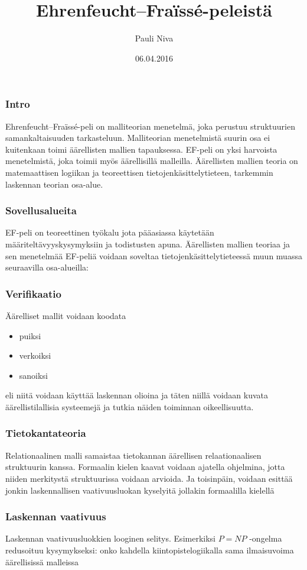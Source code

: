 \documentclass{beamer}
\title{Ehrenfeucht--Fraïssé-peleistä}
\author{Pauli Niva}
\date{06.04.2016}
\begin{document}
\frame{\titlepage}

\begin{frame}
\frametitle{Intro}
Ehrenfeucht--Fraïssé-peli on malliteorian menetelmä, joka perustuu struktuurien samankaltaisuuden tarkasteluun. \pause Malliteorian menetelmistä suurin osa ei kuitenkaan toimi äärellisten mallien tapauksessa. \pause EF-peli on yksi harvoista menetelmistä, joka toimii myös äärellisillä malleilla. \pause Äärellisten mallien teoria on matemaattisen logiikan ja teoreettisen tietojenkäsittelytieteen, tarkemmin laskennan teorian osa-alue.
\end{frame}

\begin{frame}
\frametitle{Sovellusalueita}
EF-peli on teoreettinen työkalu jota pääasiassa käytetään määriteltävyyskysymyksiin ja todistusten apuna.
Äärellisten mallien teoriaa ja sen menetelmää EF-peliä voidaan soveltaa tietojenkäsittelytieteessä muun muassa seuraavilla osa-alueilla:
\end{frame}

\begin{frame}
\frametitle{Verifikaatio}
Äärelliset mallit voidaan koodata
\begin{itemize}
\item<1-> puiksi
\item<2-> verkoiksi
\item<3-> sanoiksi
\end{itemize}
\pause \pause \pause
eli niitä voidaan käyttää laskennan olioina ja täten niillä voidaan kuvata äärellistilallisia systeemejä ja tutkia näiden toiminnan oikeellisuutta.
\end{frame}

\begin{frame}
\frametitle{Tietokantateoria}
Relationaalinen malli samaistaa tietokannan äärellisen relaationaalisen struktuurin kanssa.
\pause
Formaalin kielen kaavat voidaan ajatella ohjelmina, jotta niiden merkitystä struktuurissa voidaan arvioida.
\pause
Ja toisinpäin, voidaan esittää jonkin laskennallisen vaativuusluokan kyselyitä jollakin formaalilla kielellä
\end{frame}

\begin{frame}
\frametitle{Laskennan vaativuus}
Laskennan vaativuusluokkien looginen selitys.
\pause
Esimerkiksi $P = NP$ -ongelma redusoituu kysymykseksi: onko kahdella kiintopistelogiikalla sama ilmaisuvoima äärellisissä malleissa 
\end{frame}
\end{document}
